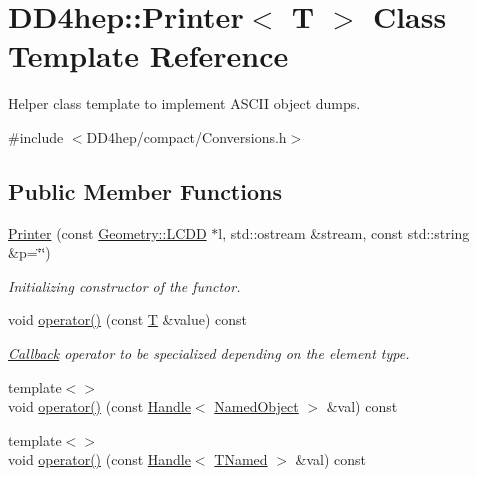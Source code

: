 \hypertarget{struct_d_d4hep_1_1_printer}{}\section{D\+D4hep\+:\+:Printer$<$ T $>$ Class Template Reference}
\label{struct_d_d4hep_1_1_printer}


Helper class template to implement A\+S\+C\+II object dumps.  




{\ttfamily \#include $<$D\+D4hep/compact/\+Conversions.\+h$>$}

\subsection*{Public Member Functions}
\begin{DoxyCompactItemize}
\item 
\hyperlink{struct_d_d4hep_1_1_printer_accc6dac339dc1c219f32c0f2cdef6b70}{Printer} (const \hyperlink{class_d_d4hep_1_1_geometry_1_1_l_c_d_d}{Geometry\+::\+L\+C\+DD} $\ast$l, std\+::ostream \&stream, const std\+::string \&p=\char`\"{}\char`\"{})
\begin{DoxyCompactList}\small\item\em Initializing constructor of the functor. \end{DoxyCompactList}\item 
void \hyperlink{struct_d_d4hep_1_1_printer_a51377db7fbaccd74e13ac13500b1192d}{operator()} (const \hyperlink{class_t}{T} \&value) const
\begin{DoxyCompactList}\small\item\em \hyperlink{class_d_d4hep_1_1_callback}{Callback} operator to be specialized depending on the element type. \end{DoxyCompactList}\item 
{\footnotesize template$<$$>$ }\\void \hyperlink{struct_d_d4hep_1_1_printer_a67e0aa5272ba12fc5b279db093a3a816}{operator()} (const \hyperlink{class_d_d4hep_1_1_handle}{Handle}$<$ \hyperlink{class_d_d4hep_1_1_named_object}{Named\+Object} $>$ \&val) const
\item 
{\footnotesize template$<$$>$ }\\void \hyperlink{struct_d_d4hep_1_1_printer_a2e92e9fc7a6049c627b1d67fd4fe16e1}{operator()} (const \hyperlink{class_d_d4hep_1_1_handle}{Handle}$<$ \hyperlink{class_t_named}{T\+Named} $>$ \&val) const
\item 

\end{DoxyCompactItemize}
